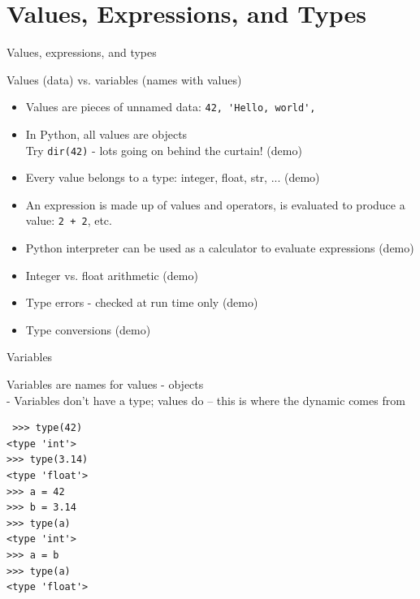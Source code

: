 \documentclass{beamer}
\begin{document}
\section{Values, Expressions, and Types}


\begin{frame}[fragile]{Values, expressions, and types}

{\large Values (data) vs. variables (names with values)}

\begin{itemize}
    \item  Values are pieces of unnamed data: \verb+42, 'Hello, world',+

    \item  In Python, all values are objects\\
      Try \verb+dir(42)+ - lots going on behind the curtain! (demo)

    \item  Every value belongs to a type: integer, float, str, ...  (demo)

    \item  An expression is made up of values and operators, is evaluated to
        produce a value:  \verb!2 + 2!, etc.

    \item  Python interpreter can be used as a calculator to evaluate expressions (demo)

    \item  Integer vs. float arithmetic (demo)

    \item  Type errors - checked at run time only (demo)
  
    \item  Type conversions (demo)
\end{itemize}

\end{frame}

\begin{frame}[fragile]{Variables}

{\large Variables are names for values - objects}\\[0.1in]
\hspace{0.5in} - Variables don’t have a type; values do -- 
this is where the dynamic comes from

\begin{verbatim}
￼>>> type(42)
<type 'int'>
>>> type(3.14)
<type 'float'>
>>> a = 42
>>> b = 3.14
>>> type(a)
<type 'int'>
>>> a = b
>>> type(a)
<type 'float'>
\end{verbatim}

\end{frame}
\end{document}

